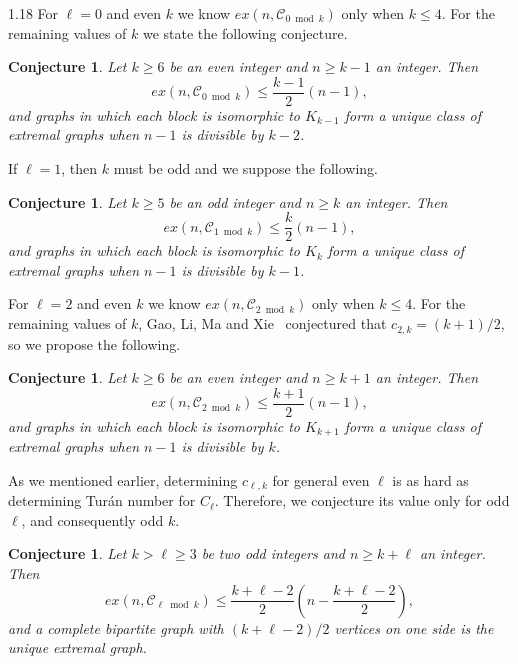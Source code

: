 \documentclass[10pt]{article}
\newtheorem{conjecture}[theorem]{Conjecture}
\let\geq\geqslant
\let\leq\leqslant
\begin{document}
\begin{spacing}{1.18}
For $\ell=0$ and even $k$ we know $ex(n,\mathcal{C}_{0\bmod k})$ only when $k \leq 4$. For the remaining values of $k$ we state the following conjecture.

\begin{conjecture}\label{conj: 0 mod even k}
    Let $k\geqslant 6$ be an even integer and $n\geqslant k-1$ an integer. Then
    \[
        ex(n,\mathcal{C}_{0 \bmod k})\leqslant \frac{k-1}{2}(n-1),
    \]
    and graphs in which each block is isomorphic to $K_{k-1}$ form a unique class of extremal graphs when $n-1$ is divisible by $k-2$. 
\end{conjecture}

If $\ell=1$, then $k$ must be odd and we suppose the following.

\begin{conjecture}\label{conj: 1 mod odd k}
    Let $k\geqslant 5$ be an odd integer and $n\geqslant k$ an integer. Then
    \[
        ex(n,\mathcal{C}_{1 \bmod k})\leqslant \frac{k}{2}(n-1),
    \]
    and graphs in which each block is isomorphic to $K_{k}$ form a unique class of extremal graphs when $n-1$ is divisible by $k-1$.  
\end{conjecture}

For $\ell=2$ and even $k$ we know $ex(n,\mathcal{C}_{2\bmod k})$ only when $k \leq 4$. For the remaining values of $k$, Gao, Li, Ma and Xie~\cite{GLMX} conjectured that $c_{2,k}=(k+1)/2$, so we propose the following.

\begin{conjecture}\label{conj: 2 mod even k}
    Let $k\geqslant 6$ be an even integer and $n\geqslant k+1$ an integer. Then
    \[
        ex(n,\mathcal{C}_{2 \bmod k})\leqslant \frac{k+1}{2}(n-1),
    \]
    and graphs in which each block is isomorphic to $K_{k+1}$ form a unique class of extremal graphs when $n-1$ is divisible by $k$. 
\end{conjecture}

As we mentioned earlier, determining $c_{\ell,k}$ for general even $\ell$ is as hard as determining Tur\'an number for $C_\ell$. Therefore, we conjecture its value only for odd $\ell$, and consequently odd $k$. 

\begin{conjecture}
    Let $k > \ell\geqslant 3$ be two odd integers and $n \geq k+\ell$ an integer. Then
    \[
        ex(n,\mathcal{C}_{\ell\bmod k})\leqslant \frac{k+\ell-2}{2}\left(n-\frac{k+\ell-2}{2}\right),
    \]
    and a complete bipartite graph with $(k+\ell-2)/2$ vertices on one side is the unique extremal graph.
\end{conjecture}


\end{spacing}
\end{document}
